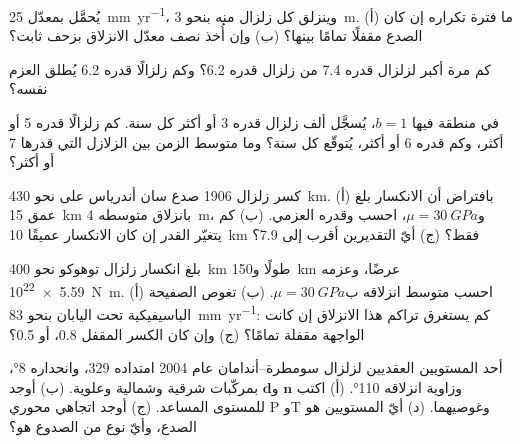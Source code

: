 \begin{exercise}[$\star$]\label{exo:b1:earthquake-source:2}
 يُحمَّل بمعدّل \qty{25}{mm.yr^{-1}}، وينزلق كل زلزال منه بنحو \qty{3}{m}. (أ) ما فترة تكراره إن كان الصدع مقفلًا تمامًا بينها؟ (ب) وإن أُخذ نصف معدّل الانزلاق بزحف ثابت؟
\end{exercise}

\begin{exercise}[$\star$]\label{exo:b1:earthquake-source:3}
كم مرة أكبر  لزلزال قدره 7.4 من زلزال قدره 6.2؟ وكم زلزالًا قدره 6.2 يُطلق العزم نفسه؟
\end{exercise}

\begin{exercise}[$\star$]\label{exo:b1:earthquake-source:4}
في منطقة فيها $b = 1$، يُسجَّل ألف زلزال قدره 3 أو أكثر كل سنة. كم زلزالًا قدره 5 أو أكثر، وكم قدره 6 أو أكثر، يُتوقّع كل سنة؟ وما متوسط الزمن بين الزلازل التي قدرها 7 أو أكثر؟
\end{exercise}

\begin{exercise}[$\star\star$]\label{exo:b1:earthquake-source:5}
كسر زلزال 1906 صدع سان أندرياس على نحو \qty{430}{km}. (أ) بافتراض أن الانكسار بلغ عمق \qty{15}{km} بانزلاق متوسطه \qty{4}{m}، و$\mu = \qty{30}{GPa}$، احسب  وقدره العزمي. (ب) كم يتغيّر القدر إن كان الانكسار عميقًا \qty{10}{km} فقط؟ (ج) أيّ التقديرين أقرب إلى 7.9؟
\end{exercise}

\begin{exercise}[$\star\star$]\label{exo:b1:earthquake-source:6}
بلغ انكسار زلزال توهوكو نحو \qty{400}{km} طولًا و\qty{150}{km} عرضًا، وعزمه \qty{5.59e22}{N.m}. (أ) احسب متوسط انزلاقه ب$\mu = \qty{30}{GPa}$. (ب) تغوص الصفيحة الباسيفيكية تحت اليابان بنحو \qty{83}{mm.yr^{-1}}: كم يستغرق تراكم هذا الانزلاق إن كانت الواجهة مقفلة تمامًا؟ (ج) وإن كان الكسر المقفل 0.8، أو 0.5؟
\end{exercise}

\begin{exercise}[$\star\star$]\label{exo:b1:earthquake-source:7}
أحد المستويين العقديين لزلزال سومطرة--أندامان عام 2004 امتداده $329$، وانحداره \ang{8}، وزاوية انزلاقه \ang{110}. (أ) اكتب $\mathbf n$ و$\mathbf d$ بمركّبات شرقية وشمالية وعلوية. (ب) أوجد    للمستوى المساعد. (ج) أوجد اتجاهي محوري P وT وغوصيهما. (د) أيّ المستويين هو الصدع، وأيّ نوع من الصدوع هو؟
\end{exercise}

